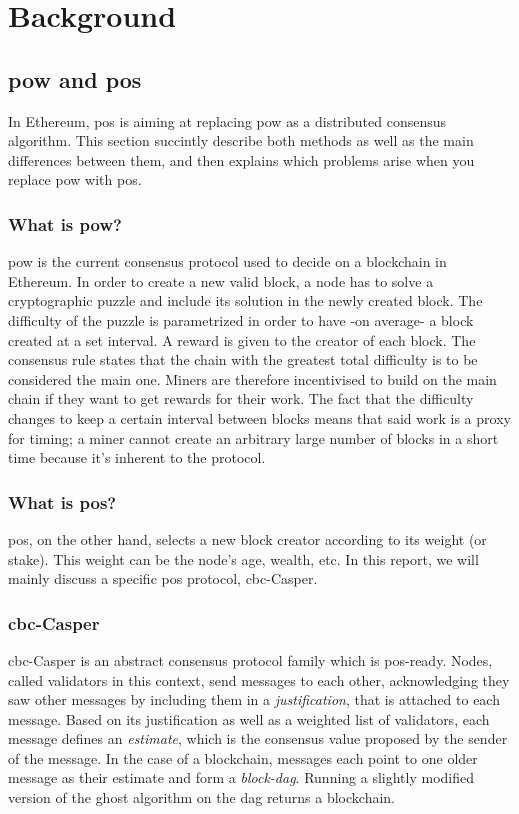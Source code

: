 \chapter{Background}
\label{chap:background}

\section{\gls{pow} and \gls{pos}}
In Ethereum, \gls{pos} is aiming at replacing \gls{pow} as a distributed
consensus algorithm. This section succintly describe both methods as well as the
main differences between them, and then explains which problems arise when you
replace \gls{pow} with \gls{pos}.

\subsection{What is \gls{pow}?}
\gls{pow} is the current consensus protocol used to decide on a blockchain in
Ethereum. In order to create a new valid block, a node has to solve a
cryptographic puzzle and include its solution in the newly created block. The
difficulty of the puzzle is parametrized in order to have -on average- a block
created at a set interval. A reward is given to the creator of each block.  The
consensus rule states that the chain with the greatest total difficulty is to be
considered the main one. Miners are therefore incentivised to build on the main
chain if they want to get rewards for their work. The fact that the difficulty
changes to keep a certain interval between blocks means that said work is a
proxy for timing; a miner cannot create an arbitrary large number of blocks in a
short time because it's inherent to the protocol.


\subsection{What is \gls{pos}?}
\gls{pos}, on the other hand, selects a new block creator according to its
weight (or stake). This weight can be the node's age, wealth, etc. In this
report, we will mainly discuss a specific \gls{pos} protocol, \gls{cbc}-Casper.

\subsection{\gls{cbc}-Casper}
\FloatBarrier
\gls{cbc}-Casper  is an abstract consensus protocol family
which is \gls{pos}-ready. Nodes, called validators in this context, send
messages to each other, acknowledging they saw other messages by including them
in a \textit{justification}, that is attached to each message. Based on its
justification as well as a weighted list of validators, each message defines an
\textit{estimate}, which is the consensus value proposed by the sender of the
message. In the case of a blockchain, messages each point to one older message
as their estimate and form a \textit{block-\gls{dag}}. Running a slightly
modified version of the \gls{ghost} algorithm on the \gls{dag} returns a
blockchain.

